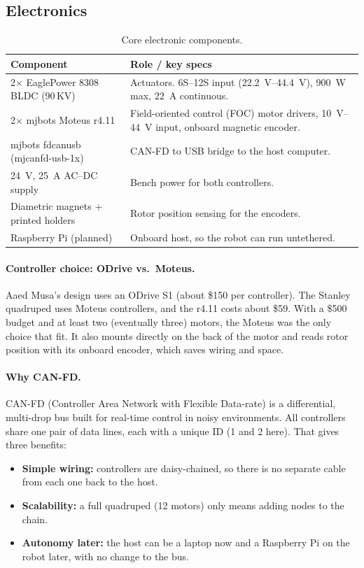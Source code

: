 \documentclass[11pt]{article}
\begin{document}
\subsection{Electronics}

\begin{table}[H]
\centering
\caption{Core electronic components.}
\label{tab:electronics}
\begin{tabularx}{\linewidth}{lX}
\toprule
\textbf{Component} & \textbf{Role / key specs} \\
\midrule
2$\times$ EaglePower 8308 BLDC (90\,KV) & Actuators. 6S--12S input
  (\SIrange{22.2}{44.4}{\volt}), \SI{900}{\watt} max, \SI{22}{\ampere} continuous. \\
2$\times$ mjbots Moteus r4.11 & Field-oriented control (FOC) motor drivers,
  \SIrange{10}{44}{\volt} input, onboard magnetic encoder. \\
mjbots fdcanusb (mjcanfd-usb-1x) & CAN-FD to USB bridge to the host computer. \\
\SI{24}{\volt}, \SI{25}{\ampere} AC--DC supply & Bench power for both controllers. \\
Diametric magnets + printed holders & Rotor position sensing for the encoders. \\
Raspberry Pi (planned) & Onboard host, so the robot can run untethered. \\
\bottomrule
\end{tabularx}
\end{table}

\paragraph{Controller choice: ODrive vs.\ Moteus.}
Aaed Musa's design uses an ODrive S1 (about \$150 per controller). The Stanley
quadruped uses Moteus controllers, and the r4.11 costs about \$59. With a
\$500 budget and at least two (eventually three) motors, the Moteus was the only
choice that fit. It also mounts directly on the back of the motor and reads
rotor position with its onboard encoder, which saves wiring and space.

\paragraph{Why CAN-FD.}
CAN-FD (Controller Area Network with Flexible Data-rate) is a differential,
multi-drop bus built for real-time control in noisy environments. All
controllers share one pair of data lines, each with a unique ID (1 and 2 here).
That gives three benefits:
\begin{itemize}
  \item \textbf{Simple wiring:} controllers are daisy-chained, so there is no
        separate cable from each one back to the host.
  \item \textbf{Scalability:} a full quadruped (12 motors) only means adding
        nodes to the chain.
  \item \textbf{Autonomy later:} the host can be a laptop now and a Raspberry Pi
        on the robot later, with no change to the bus.
\end{itemize}
\end{document}

